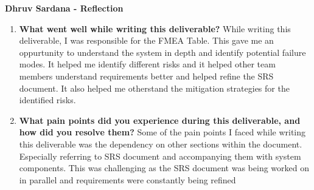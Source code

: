 \documentclass{article}
\begin{document}
\textbf{Dhruv Sardana  - Reflection}
\begin{enumerate}
  \item \textbf{What went well while writing this deliverable?}\newline
    While writing this deliverable, I was responsible for the FMEA Table. This gave me an oppurtunity to 
    understand the system in depth and identify potential failure modes. It helped me identify different risks and 
    it helped other team members understand requirements better and helped refine the SRS document. 
    It also helped me otherstand the mitigation strategies for the identified risks.

  \item \textbf{What pain points did you experience during this
    deliverable, and how did you resolve them?}\newline
    Some of the pain points I faced while writing this deliverable was the dependency on other sections within the document.
    Especially referring to SRS document and accompanying them with system components. 
    This was challenging as the SRS document was being worked on in parallel and requirements were constantly being refined
\end{enumerate}
\end{document}

